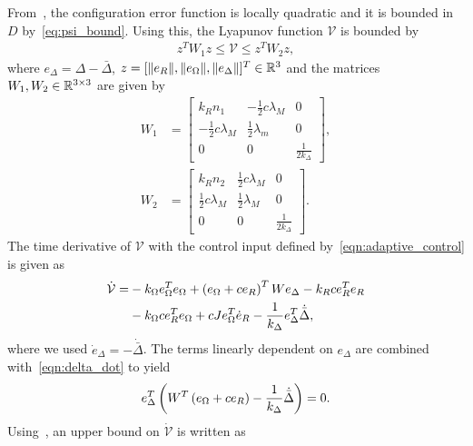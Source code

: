 From~, the configuration error function is locally quadratic and it is bounded in \( D \) by~\cref{eq:psi_bound}.
Using this, the Lyapunov function \( \mathcal{V} \) is bounded by
\begin{align*} %
	z^T W_1 z \leq \mathcal{V} \leq z^T W_2 z ,
\end{align*}
where \( e_\Delta = \Delta - \bar{\Delta} \), \( z = [\|e_R\|,\|e_\Omega\|,\|e_\Delta\|]^T\in\mathbb{R}^3 \) and the matrices \(W_1,W_2 \in \mathbb{R}^{3 \times 3}\) are given by
\begin{align*}
	W_1 & = \begin{bmatrix}
		k_R n_1 & -\frac{1}{2} c \lambda_M & 0 \\
		-\frac{1}{2} c \lambda_M & \frac{1}{2} \lambda_m & 0 \\
		0 & 0 & \frac{1}{2 k_\Delta}
	\end{bmatrix},\\
	W_2 & = \begin{bmatrix}
		k_R n_2 & \frac{1}{2} c \lambda_M & 0 \\
		\frac{1}{2} c \lambda_M & \frac{1}{2} \lambda_M & 0 \\
		0 & 0 & \frac{1}{2 k_\Delta}
	\end{bmatrix}.
\end{align*}
The time derivative of \( \mathcal{V}\) with the control input defined by~\cref{eqn:adaptive_control} is given as
\begin{align*}
	\dot{\mathcal{V}} =& - k_\Omega e_\Omega^T e_\Omega + \left( e_\Omega + c e_R \right)^T W e_\Delta - k_R c e_R^T e_R \nonumber\\
	&- k_\Omega c e_R^T e_\Omega + c J e_\Omega^T \dot{e}_R - \frac{1}{k_\Delta} e_\Delta^T \dot{\bar{\Delta}} , \label{eqn:vdot}
\end{align*}
where we used \( \dot{e}_\Delta = - \dot{\bar{\Delta}} \).
The terms linearly dependent on \( e_\Delta\) are combined with~\cref{eqn:delta_dot} to yield
\begin{align*}
	 e_\Delta^T \left( W^T \left( e_\Omega + c e_R \right) - \frac{1}{k_\Delta} \dot{\bar{\Delta}} \right) = 0. 
\end{align*}
Using~, an upper bound on \( \dot{\mathcal{V}} \) is written as
